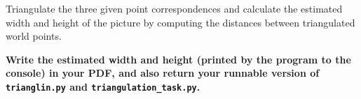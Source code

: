 \documentclass[12pt]{article} %
\newenvironment{exercise}[2][Task]{\begin{trivlist}
\item[\hskip \labelsep {\bfseries #1}\hskip \labelsep {\bfseries #2.}]}{\end{trivlist}}
\begin{document}
\begin{exercise}{3}
\noindent Triangulate the three given point correspondences and calculate the estimated width and height of the picture by computing the distances between triangulated world points.


\noindent \textbf{Write the estimated width and height (printed by the program to the console) in your PDF, and also return your runnable version of \texttt{trianglin.py} and \texttt{triangulation\_task.py}.}
\end{exercise}
\end{document}
